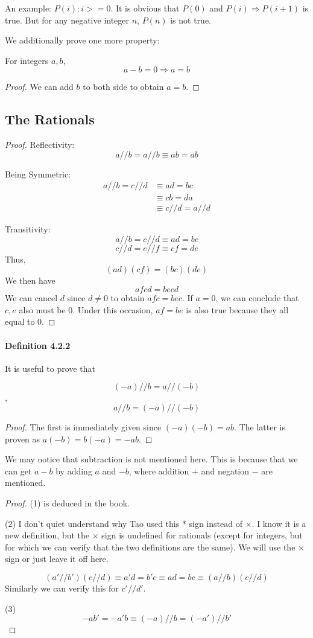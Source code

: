 An example: $P(i): i>=0$. It is obvious that $P(0)$ and $P(i) \Longrightarrow P(i+1)$ is true. But for any  
negative integer $n$, $P(n)$ is not true.

We additionally prove one more property:
\begin{lem}
For integers $a,b$,
\[
a-b=0\Longrightarrow a=b
\]
\end{lem}
\begin{proof}
We can add $b$ to both side to obtain $a=b$.
\end{proof}

\subsection{The Rationals}
\begin{proof}
Reflectivity:
\[
a//b = a//b \equiv ab=ab
\] 

Being Symmetric:
\begin{align*}
a//b = c//d 
&\equiv ad = bc \\
&\equiv cb = da \\
&\equiv c//d = a//d
\end{align*}

Transitivity:
\[
a//b = c//d \equiv ad = bc
\]
\[
c//d = e//f \equiv cf = de
\]
Thus,
\[
(ad)(cf) = (bc)(de)
\]
We then have
\[
afcd = becd
\]
We can cancel $d$ since $d \neq 0$ to obtain $afc=bec$. If $a=0$, we can conclude that $c,e$ also must be 
$0$. Under this occasion, $af=be$ is also true because they all equal to $0$. 
\end{proof}

\paragraph{Definition 4.2.2}
It is useful to prove that 
\begin{lem} \label{lem4.2.3}
\[
(-a)//b = a//(-b)
\]
,
\[
a//b = (-a)//(-b)
\]
\end{lem}
\begin{proof}
The first is immediately given since $(-a)(-b) = ab$. The latter is proven as $a(-b) = b(-a) = -ab$.
\end{proof}

We may notice that subtraction is not mentioned here. This is because that we can get $a-b$ by adding $a$ 
and $-b$, where addition $+$ and negation $-$ are mentioned.

\begin{proof}
(1) is deduced in the book.

(2)
I don't quiet understand why Tao used this $*$ sign instead of $\times$. I know it is a new definition, 
but the $\times$ sign is undefined for rationals (except for integers, but for which we can verify that 
the two definitions are the same). We will use the $\times $ sign or just leave it off here.

\[
(a'//b')(c//d) \equiv a'd = b'c \equiv ad=bc \equiv (a//b)(c//d)
\]
Similarly we can verify this for $c'//d'$.

(3)
\[
-ab'=-a'b \equiv (-a)//b = (-a')//b'
\]
\end{proof}

